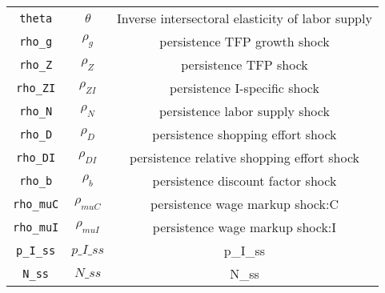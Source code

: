 \begin{center}
\begin{longtable}{ccc}
\texttt{theta} & ${\theta}$ & Inverse intersectoral elasticity of labor supply\\
\texttt{rho\_g} & ${\rho_g}$ & persistence TFP growth shock\\
\texttt{rho\_Z} & ${\rho_Z}$ & persistence TFP shock\\
\texttt{rho\_ZI} & ${\rho_{ZI}}$ & persistence I-specific shock\\
\texttt{rho\_N} & ${\rho_N}$ & persistence labor supply shock\\
\texttt{rho\_D} & ${\rho_D}$ & persistence shopping effort shock\\
\texttt{rho\_DI} & ${\rho_{DI}}$ & persistence relative shopping effort shock\\
\texttt{rho\_b} & ${\rho_b}$ & persistence discount factor shock\\
\texttt{rho\_muC} & ${\rho_{muC}}$ & persistence wage markup shock:C\\
\texttt{rho\_muI} & ${\rho_{muI}}$ & persistence wage markup shock:I\\
\texttt{p\_I\_ss} & $p\_I\_ss$ & p\_I\_ss\\
\texttt{N\_ss} & $N\_ss$ & N\_ss\\
\hline%
\end{longtable}
\end{center}
